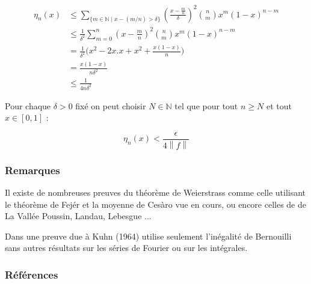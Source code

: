 \documentclass[
	10pt, %
	xcolor={svgnames}
]{beamer}
\begin{document}
\begin{frame}

\begin{align*}
	\eta_n(x) &\leq \sum_{\{m \in \mathbb{N} \mid x - (m/n) > \delta \}} \left( \frac{x-\frac{m}{n}}{\delta} \right )^{2} \binom{n}{m} x^{m}(1-x)^{n-m} \\
		  &\leq \frac{1}{\delta^{2}} \sum_{m=0}^{n} \left( x-\frac{m}{n} \right)^{2} \binom{n}{m} x^{m}(1-x)^{n-m} \\
		  &= \frac{1}{\delta^{2}} \bigl( x^{2}-2x.x+x^{2}+\frac{x(1-x)}{n} \bigr) \\
		  &= \frac{x(1-x)}{n\delta^{2}} \\
		  &\leq \frac{1}{4n\delta^{2}}
\end{align*}

Pour chaque \( \delta > 0 \) fixé on peut choisir \( N \in \mathbb{N} \) tel que pour tout \( n \geq N \) et tout \( x \in [0,1] \) :

\begin{equation*}
	\eta_n(x) < \frac{\epsilon}{4 {\left\lVert f \right\rVert}} 
\end{equation*}

\end{frame}


\begin{frame}
	\frametitle{Remarques}

	Il existe de nombreuses preuves du théorème de Weierstrass comme celle utilisant le théorème de Fejér et la moyenne de Cesàro vue en cours, ou encore celles de de La Vallée Poussin, Landau, Lebesgue ...

	Dans \cite[p.~ 60-61]{pinkus2000approximation} une preuve due à Kuhn (1964) utilise seulement l'inégalité de Bernouilli sans autres résultats sur les séries de Fourier ou sur les intégrales.
\end{frame}

\begin{frame} %
	\frametitle{Références}	
	\printbibliography

\end{frame}
\end{document}
